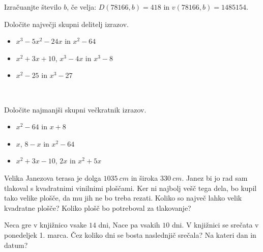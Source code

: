             \begin{naloga}
                Izračuanjte število $b$, če velja: $D(78 166, b)=418$ in $v(78 166, b)=1 485 154$. 
            \end{naloga}

            \begin{naloga}
                Določite največji skupni delitelj izrazov.
                \begin{itemize}
                    \item $x^3-5x^2-24x$ in $x^2-64$ 
                    \item $x^2+3x+10$, $x^3-4x$ in $x^3-8$ 
                    \item $x^2-25$ in $x^3-27$ 
                \end{itemize}
            \end{naloga}
~
            \begin{naloga}
                Določite najmanjši skupni večkratnik izrazov.
                \begin{itemize}
                    \item $x^2-64$ in $x+8$ 
                    \item $x$, $8-x$ in $x^2-64$ 
                    \item $x^2+3x-10$, $2x$ in $x^2+5x$ 
                \end{itemize}
            \end{naloga}

            \begin{naloga}
                Velika Janezova terasa je dolga $1035~cm$ in široka $330~cm$. Janez bi jo rad sam tlakoval s kvadratnimi vinilnimi ploščami.
                Ker ni najbolj vešč tega dela, bo kupil tako velike plošče, da mu jih ne bo treba rezati.
                Koliko so največ lahko velik kvadratne plošče? Koliko plošč bo potreboval za tlakovanje? 
            \end{naloga}

            \begin{naloga}
                Neca gre v knjižnico vsake $14$ dni, Nace pa vsakih $10$ dni. V knjižnici se srečata v ponedeljek 1. marca.
                Čez koliko dni se bosta naslednjič srečala? Na kateri dan in datum?                     
            \end{naloga}

        